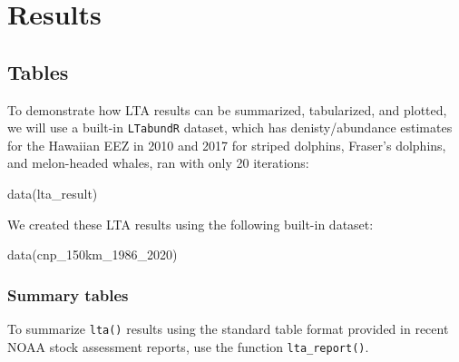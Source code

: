 \documentclass[
]{book}
\newenvironment{Shaded}{\begin{snugshade}}{\end{snugshade}}
\newcommand{\AttributeTok}[1]{\textcolor[rgb]{0.77,0.63,0.00}{#1}}
\newcommand{\ConstantTok}[1]{\textcolor[rgb]{0.00,0.00,0.00}{#1}}
\newcommand{\ControlFlowTok}[1]{\textcolor[rgb]{0.13,0.29,0.53}{\textbf{#1}}}
\newcommand{\FunctionTok}[1]{\textcolor[rgb]{0.00,0.00,0.00}{#1}}
\newcommand{\NormalTok}[1]{#1}
\newcommand{\OtherTok}[1]{\textcolor[rgb]{0.56,0.35,0.01}{#1}}
\newcommand{\SpecialCharTok}[1]{\textcolor[rgb]{0.00,0.00,0.00}{#1}}
\begin{document}
\hypertarget{part-results}{%
\part{Results}\label{part-results}}

\hypertarget{tables}{%
\chapter{Tables}\label{tables}}

To demonstrate how LTA results can be summarized, tabularized, and plotted, we will use a built-in \texttt{LTabundR} dataset, which has denisty/abundance estimates for the Hawaiian EEZ in 2010 and 2017 for striped dolphins, Fraser's dolphins, and melon-headed whales, ran with only 20 iterations:

\begin{Shaded}
\begin{Highlighting}[]
\FunctionTok{data}\NormalTok{(lta\_result)}
\end{Highlighting}
\end{Shaded}

We created these LTA results using the following built-in dataset:

\begin{Shaded}
\begin{Highlighting}[]
\FunctionTok{data}\NormalTok{(cnp\_150km\_1986\_2020)}
\end{Highlighting}
\end{Shaded}

\hypertarget{summary-tables}{%
\section*{Summary tables}\label{summary-tables}}

To summarize \texttt{lta()} results using the standard table format provided in recent NOAA stock assessment reports, use the function \texttt{lta\_report()}.

\begin{Shaded}
\end{Shaded}
\end{document}
